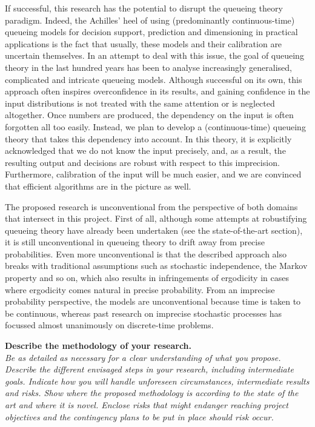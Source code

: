 \documentclass[11pt,dvipsnames,usenames,a4paper]{article}
\begin{document}
{If successful, this research has the potential to disrupt the queueing theory paradigm.
Indeed, the Achilles' heel of using (predominantly continuous-time) queueing models for decision support, prediction and dimensioning in practical applications is the fact that usually, these models and their calibration are uncertain themselves.
In an attempt to deal with this issue, the goal of queueing theory in the last hundred years has been to analyse increasingly generalised, complicated and intricate queueing models.
Although successful on its own, this approach often inspires overconfidence in its results, and gaining confidence in the input distributions is not treated with the same attention or is neglected altogether.
Once numbers are produced, the dependency on the input is often forgotten all too easily.
Instead, we plan to develop a (continuous-time) queueing theory that takes this dependency into account. In this theory, it is explicitly acknowledged that we do not know the input precisely, and, as a result, the resulting output and decisions are robust with respect to this imprecision. Furthermore, calibration of the input will be much easier, and we are convinced that efficient algorithms are in the picture as well.

The proposed research is unconventional from the perspective of both domains that intersect in this project.
First of all, although some attempts at robustifying queueing theory have already been undertaken (see the state-of-the-art section), it is still unconventional in queueing theory to drift away from precise probabilities. Even more unconventional is that the described approach also breaks with traditional assumptions such as stochastic independence, the Markov property and so on, which also results in infringements of ergodicity in cases where ergodicity comes natural in precise probability.
From an imprecise probability perspective, the models are unconventional because time is taken to be continuous, whereas past research on imprecise stochastic processes has focussed almost unanimously on discrete-time problems.
}

\vspace{7pt}

\textbf{Describe the methodology of your research.}\\
\textit{Be as detailed as necessary for a clear understanding of what you propose.
Describe the different envisaged steps in your research, including intermediate goals. Indicate how you will handle unforeseen circumstances, intermediate results and risks.
Show where the proposed methodology is according to the state of the art and where it is novel.
Enclose risks that might endanger reaching project objectives and the contingency plans to be put in place should risk occur.}
\end{document}
